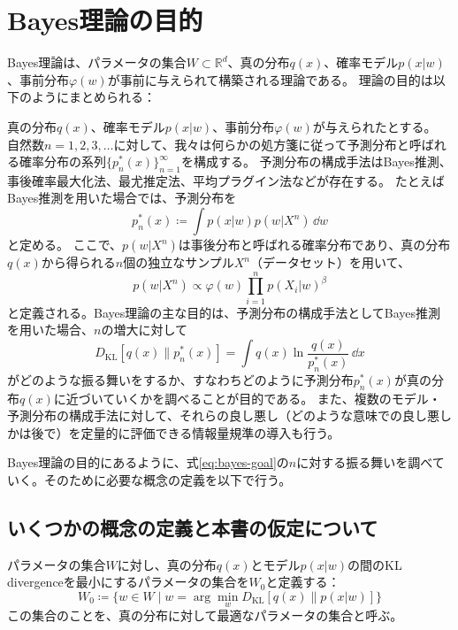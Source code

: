\documentclass[dvipdfmx]{jsarticle}
\begin{document}
\section{Bayes理論の目的}
Bayes理論は、パラメータの集合$W \subset \mathbb{R}^d$、真の分布$q(x)$、確率モデル$p(x|w)$、事前分布$\varphi(w)$が事前に与えられて構築される理論である。
理論の目的は以下のようにまとめられる：
\begin{mybox}[Bayes理論の目的]
    真の分布$q(x)$、確率モデル$p(x|w)$、事前分布$\varphi(w)$が与えられたとする。
    自然数$n=1,2,3,\ldots$に対して、我々は何らかの処方箋に従って予測分布と呼ばれる確率分布の系列$\{p_n^{*}(x)\}_{n=1}^{\infty}$を構成する。
    予測分布の構成手法はBayes推測、事後確率最大化法、最尤推定法、平均プラグイン法などが存在する。
    たとえばBayes推測を用いた場合では、予測分布を
    \begin{equation}
        p_{n}^{*}(x) \coloneqq \int p(x|w)p(w|X^n)\,\dd{w}
    \end{equation}
    と定める。
    ここで、$p(w|X^n)$は事後分布と呼ばれる確率分布であり、真の分布$q(x)$から得られる$n$個の独立なサンプル$X^n$（データセット）を用いて、
    \begin{equation}
        p(w|X^n) \propto \varphi(w)\prod_{i=1}^{n}p(X_i|w)^{\beta}
    \end{equation}
    と定義される。Bayes理論の主な目的は、予測分布の構成手法としてBayes推測を用いた場合、$n$の増大に対して
    \begin{equation}
        D_{\text{KL}}[q(x) \parallel p_n^{*}(x)] = \int q(x)\ln\frac{q(x)}{p_n^{*}(x)}\,\dd{x}
        \label{eq:bayes-goal}
    \end{equation}
    がどのような振る舞いをするか、すなわちどのように予測分布$p_n^*(x)$が真の分布$q(x)$に近づいていくかを調べることが目的である。
    また、複数のモデル・予測分布の構成手法に対して、それらの良し悪し（どのような意味での良し悪しかは後で）を定量的に評価できる情報量規準の導入も行う。
\end{mybox}
Bayes理論の目的にあるように、式\eqref{eq:bayes-goal}の$n$に対する振る舞いを調べていく。そのために必要な概念の定義を以下で行う。

\subsection{いくつかの概念の定義と本書の仮定について}

\begin{mybox}[真の分布に対して最適なパラメータの集合]
    パラメータの集合$W$に対し、真の分布$q(x)$とモデル$p(x|w)$の間のKL divergenceを最小にするパラメータの集合を$W_0$と定義する：
    \begin{equation}
        W_0 \coloneqq \{ w \in W \mid w = \arg\min_{w} D_{\mathrm{KL}}[q(x) \parallel p(x|w)] \}
    \end{equation}
    この集合のことを、真の分布に対して最適なパラメータの集合と呼ぶ。
\end{mybox}
\end{document}
